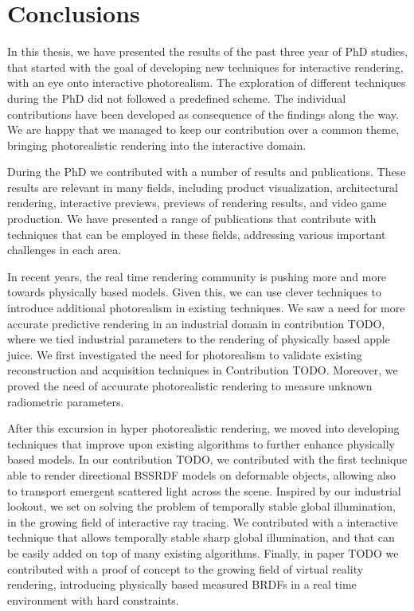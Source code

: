 \chapter{Conclusions}
In this thesis, we have presented the results of the past three year of PhD studies, that started with the goal of developing new techniques for interactive rendering, with an eye onto interactive photorealism. The exploration of different techniques during the PhD did not followed a predefined scheme. The individual contributions have been developed as consequence of the findings along the way. We are happy that we managed to keep our contribution over a common theme, bringing photorealistic rendering into the interactive domain.

During the PhD we contributed with a number of results and publications. These results are relevant in many fields, including product visualization, architectural rendering, interactive previews, previews of rendering results, and video game production. We have presented a range of publications that contribute with techniques that can be employed in these fields, addressing various important challenges in each area. 

In recent years, the real time rendering community is pushing more and more towards physically based models. Given this, we can use clever techniques to introduce additional photorealism in existing techniques. We saw a need for more accurate predictive rendering in an industrial domain in contribution TODO, where we tied industrial parameters to the rendering of physically based apple juice. We first investigated the need for photorealism to validate existing reconstruction and acquisition techniques in Contribution TODO. Moreover, we proved the need of accuurate photorealistic rendering to measure unknown radiometric parameters. 

After this excursion in hyper photorealistic rendering, we moved into developing techniques that improve upon existing algorithms to further enhance physically based models. In our contribution TODO, we contributed with the first technique able to render directional BSSRDF models on deformable objects, allowing also to transport emergent scattered light across the scene. Inspired by our industrial lookout, we set on solving the problem of temporally stable global illumination, in the growing field of interactive ray tracing. We contributed with a interactive technique that allows temporally stable sharp global illumination, and that can be easily added on top of many existing algorithms. Finally, in paper TODO we contributed with a proof of concept to the growing field of virtual reality rendering, introducing physically based measured BRDFs in a real time environment with hard constraints.   

